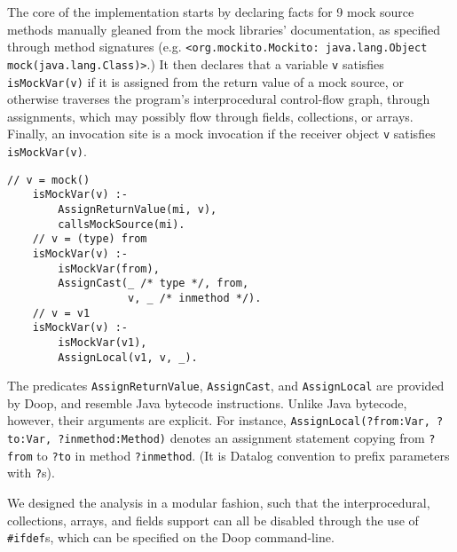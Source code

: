 The core of the implementation starts by declaring facts for 9 mock source methods manually gleaned from the mock libraries' documentation, as specified through method signatures (e.g. 
\texttt{<org.mockito.Mockito: java.lang.Object mock(java.lang.Class)>}.)
It then declares that a variable {\tt v} satisfies \verb+isMockVar(v)+ if it is assigned from the return value of a mock source, or otherwise traverses the program's interprocedural control-flow graph, through assignments, which may possibly flow through fields, collections, or arrays. Finally, an invocation site is a mock invocation if the receiver object {\tt v} satisfies \verb+isMockVar(v)+.

\begin{lstlisting}[basicstyle=\ttfamily\small,numbers=none,label={lst:core}]
    // v = mock()
    isMockVar(v) :-
        AssignReturnValue(mi, v),
        callsMockSource(mi).
    // v = (type) from
    isMockVar(v) :-
        isMockVar(from),
        AssignCast(_ /* type */, from,
                   v, _ /* inmethod */).
    // v = v1
    isMockVar(v) :-
        isMockVar(v1),
        AssignLocal(v1, v, _).
\end{lstlisting}

The predicates \texttt{AssignReturnValue}, \texttt{AssignCast}, and \texttt{AssignLocal} are provided by Doop, and resemble Java bytecode instructions. Unlike Java bytecode, however, their arguments are explicit. For instance, \texttt{AssignLocal(?from:Var, ?to:Var, ?inmethod:Method)} denotes an assignment statement copying from \texttt{?from} to \texttt{?to} in method \texttt{?inmethod}. (It is Datalog convention to prefix parameters with \texttt{?}s).

We designed the analysis in a modular fashion, such that the interprocedural, collections, arrays, and fields support can all be disabled through the use of \verb+#ifdef+s, which can be specified on the Doop command-line.

